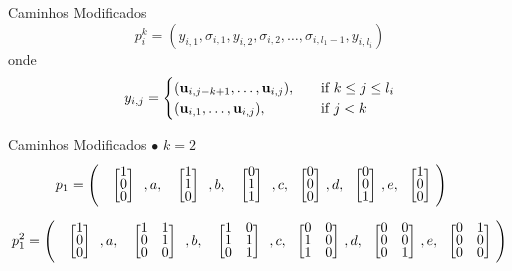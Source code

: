 \begin{frame}{Caminhos Modificados}
\begin{equation}
  \label{eq:modifiedPath}
 p_i^k= (y_{i,1},\sigma_{i,1},y_{i,2},\sigma_{i,2},\dots,\sigma_{i,l_1-1},y_{i,l_i}) 
\end{equation}
onde 
\begin{equation}
  \label{eq:modifiedPathb}
y_{i,j}=\begin{cases}
    (\mathbf{u}_{i,j-k+1},\dots,\mathbf{u}_{i,j}),& \quad \text{if } k\leq j\leq l_i\\
    (\mathbf{u}_{i,1},\dots,\mathbf{u}_{i,j}),  & \quad \text{if } j<k
  \end{cases}
\end{equation}
\end{frame}
\begin{frame}{Caminhos Modificados}
  \setlength\arraycolsep{2pt}
 $\bullet$ $k=2$
 \small
 \begin{align*}
   p_1&= \left(\tikz[baseline]{
            \node[anchor=base] (n1)
            {$\colvec{1\\0\\0}$};
        },a,\tikz[baseline]{
            \node[anchor=base] (n2)
            {$\colvec{1\\1\\0}$};
        },b,\tikz[baseline]{
            \node[anchor=base] (n3)
            {$\colvec{0\\1\\1}$};
        },c,\colvec{0\\0\\0},d,\colvec{0\\0\\1},e,\colvec{1\\0\\0}\right)
   \tikz[baseline] \node[coordinate] (baba) {};
\end{align*}
 \begin{align*}
  p_1^2&= \left(\tikz[baseline]{
            \node[anchor=base] (t1)
            {$\colvec{1\\0\\0}$};
        },a,\tikz[baseline]{
            \node[anchor=base] (t2)
            {$\colvec{1&1\\0&1\\0&0}$};
        },b,\tikz[baseline]{
            \node[anchor=base] (t3)
            {$\colvec{1&0\\1&1\\0&1}$};
        },c,\colvec{0&0\\1&0\\1&0},d,\colvec{0&0\\0&0\\0&1},e,\colvec{0&1\\0&0\\0&0}\right) \\ 

\end{align*}
\end{frame}
